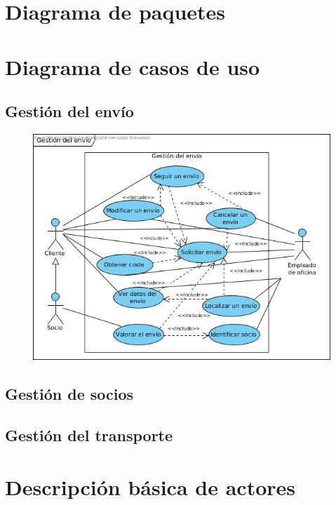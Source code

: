 \newpage

\section{Diagrama de paquetes}
\newpage


\section{Diagrama de casos de uso}
\subsection{Gestión del envío}
\begin{figure}[h]
	\centering
		\includegraphics[width=15cm]{diagr_envio}
\end{figure}

\newpage

\subsection{Gestión de socios}


\newpage

\subsection{Gestión del transporte}


\newpage

\section{Descripción básica de actores}
\newpage

